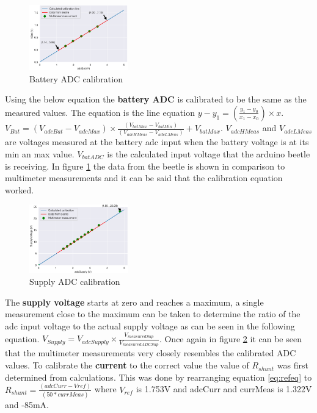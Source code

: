 \begin{figure}
	\begin{center}
		\includegraphics[width=0.38\textwidth]{./Figures/A8/batteryA8.png}
	\end{center}
	\caption{Battery ADC calibration}
	\label{fig:A8bat}
\end{figure}
Using the below equation the \textbf{battery ADC} is calibrated to be the same as the measured values. The equation is the line equation $y-y_1=(\frac{y_1-y_0}{x_1-x_0})\times x$. \newline
$V_{Bat}=(V_{adcBat}-V_{adcMax})\times \frac{(V_{batMax}-V_{batMin})}{(V_{adcHMeas}-V_{adcLMeas})}+V_{batMax}$. $V_{adcHMeas}$ and $V_{adcLMeas}$ are voltages measured at the battery adc input when the battery voltage is at its min an max value. $V_{batADC}$ is the calculated input voltage that the arduino beetle is receiving. In figure \ref{fig:A8bat} the data from the beetle is shown in comparison to multimeter measurements and it can be said that the calibration equation worked.



\begin{figure}
	\begin{center}
		\includegraphics[width=0.38\textwidth]{./Figures/A8/supplyA8.png}
	\end{center}
	\caption{Supply ADC calibration}
	\label{fig:A8sup}
\end{figure}

The \textbf{supply voltage} starts at zero and reaches a maximum, a single measurement close to the maximum can be taken to determine the ratio of the adc input voltage to the actual supply voltage as can be seen in the following equation.
$V_{Supply} = V_{adcSupply} \times \frac{V_{measuredSup}}{V_{measuredADCSup}}$. Once again in figure \ref{fig:A8sup} it can be seen that the multimeter measurements very closely resembles the calibrated ADC values.
To calibrate the \textbf{current} to the correct value the value of $R_{shunt}$ was first determined from calculations. This was done by rearranging equation \ref{eq:refeq} to $R_{shunt}= \frac{(adcCurr-Vref)}{(50*currMeas)}$ where $V_{ref}$ is 1.753V and adcCurr and currMeas is 1.322V and -85mA. 

